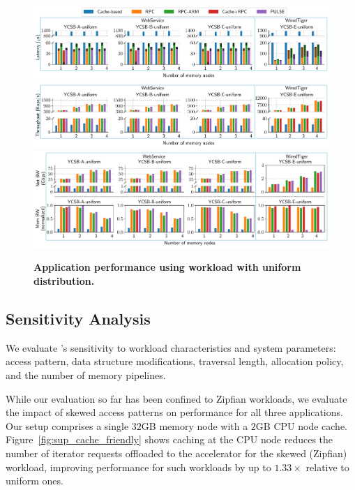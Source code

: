 \begin{figure}[t]
\centering
  \includegraphics[width=\textwidth]{fig/pulse/latency_uniform.pdf}
  \label{fig:sup_eval_perf_e2e_latency_uniform}
  \includegraphics[width=\textwidth]{fig/pulse/throughput_uniform.pdf}
  \label{fig:sup_eval_perf_e2e_throughput_uniform}
  \includegraphics[width=\textwidth]{fig/pulse/network_memory_uniform.pdf}
  \label{fig:sup_eval_perf_e2e_utilization_uniform}
  \caption[Application performance using workload with uniform distribution]{\textbf{Application performance using workload with uniform distribution.}}
  \label{fig:sup_eval_uniform}

\end{figure}


\subsection{\pulse Sensitivity Analysis}
\label{ssec:pulsesensitivity}


We evaluate \pulse's sensitivity to workload characteristics and system parameters: access pattern, data structure modifications, traversal length, allocation policy, and the number of \pulse memory pipelines. 


While our evaluation so far has been confined to Zipfian workloads, we evaluate the impact of skewed access patterns on \pulse performance for all three applications. Our setup comprises a single $32$GB memory node with a $2$GB CPU node cache. Figure~\ref{fig:sup_cache_friendly} shows caching at the CPU node reduces the number of iterator requests offloaded to the \pulse accelerator for the skewed (Zipfian) workload, improving \pulse performance for such workloads by up to $1.33\times$ relative to uniform ones.

